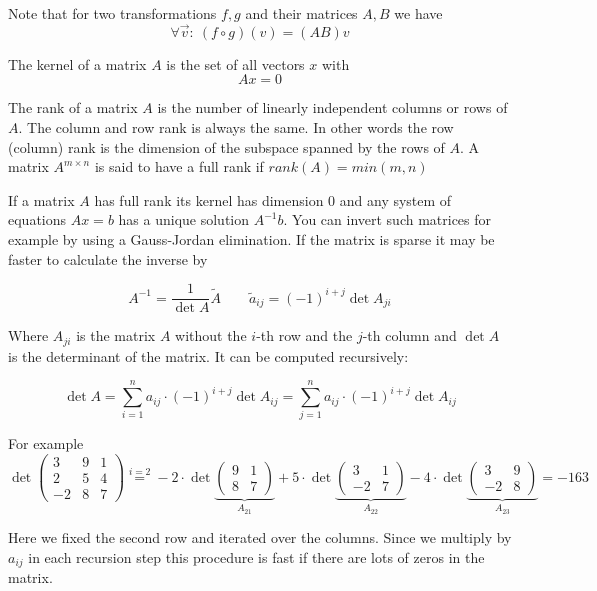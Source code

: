 Note that for two transformations $f,g$ and their matrices $A,B$ we have
\[\forall \vec v:\ (f\circ g)(v) = (AB)v\]

\begin{Def} 
 The kernel of a matrix $A$ is the set of all vectors $x$ with
$$Ax=0$$
\end{Def}

\begin{Def}
 The rank of a matrix $A$ is the number of linearly independent columns or rows of $A$. The column and row rank is always the same. In other words the row (column) rank is the dimension of the subspace spanned by the rows of $A$. A matrix $A^{m \times n}$ is said to have a full rank if $rank(A)=min(m,n)$
\end{Def}

If a matrix $A$ has full rank its kernel has dimension 0 and any system of equations $A x=b$ has a unique solution $A^{-1}b$. You can invert such matrices for example by using a Gauss-Jordan elimination. If the matrix is sparse it may be faster to calculate the inverse by

\[A^{-1} = \frac{1}{\det A} \tilde A \qquad \tilde a_{ij} = (-1)^{i+j} \det A_{ji}\]

Where $A_{ji}$ is the matrix $A$ without the $i$-th row and the $j$-th column and $\det A$ is the determinant of the matrix. It can be computed recursively:

\[\det A = \sum_{i=1}^n a_{ij} \cdot (-1)^{i+j} \det A_{ij} = \sum_{j=1}^n a_{ij} \cdot (-1)^{i+j} \det A_{ij} \]

For example
\[\det \begin{pmatrix} 
3 & 9 & 1\\
2 & 5 & 4\\
-2 & 8 & 7\end{pmatrix} \stackrel{i=2}{=}
-2\cdot \det \underbrace{\begin{pmatrix} 
9 & 1\\ 
8 & 7\end{pmatrix}}_{A_{21}} + 
5\cdot \det \underbrace{\begin{pmatrix}
3 & 1\\
-2 & 7\end{pmatrix}}_{A_{22}} -
4\cdot \det \underbrace{\begin{pmatrix} 
3 & 9\\ 
-2 & 8\end{pmatrix}}_{A_{23}}= -163\]

Here we fixed the second row and iterated over the columns. Since we multiply by $a_{ij}$ in each recursion step this procedure is fast if there are lots of zeros in the matrix.
